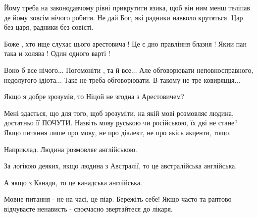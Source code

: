 \begin{itemize}
 

Йому треба на законодавчому рівні прикрутити язика, щоб він ним менш теліпав де
йому зовсім нічого робити. Не дай Бог, які радники навколо крутяться. Цар без
царя, радники без совісті.


 

Боже , хто ище слухає цього арестовича ! Це є дно правління блазня ! Якии пан
така и холява ! Один одного варті !

 

\obeycr
Воно б все нічого...
Погомоніти , та й все...
Але обговорювати неповносправного, недолугого ідіота...
Таке не треба обговорювати.
В такому не тре ковиряцця...
\restorecr


 

Якщо я добре зрозумів, то Ніцой не згодна з Арестовичем?

Мені здається, що для того, щоб зрозуміти, на якій мові розмовляє людина,
достатньо її ПОЧУТИ. Назвіть мову руською чи російською, їх дві не стане? Якщо
питання лише про мову, не про діалект, не про якісь акценти, тощо.

Наприклад. Людина розмовляє англійською.

За логікою деяких, якщо людина з Австралії, то це австралійська англійська.

А якщо з Канади, то це канадська англійська.

Мовне питання - не на часі, це піар. Бережіть себе! Якщо часто та раптово
відчуваєте ненависть - своєчасно звертайтеся до лікаря.


\end{itemize}
